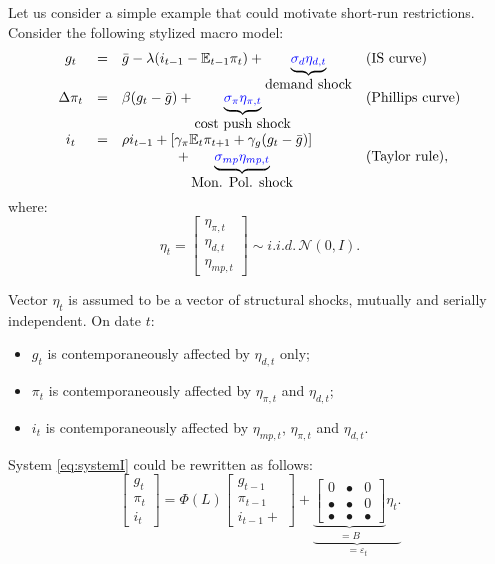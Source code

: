 \documentclass[
  11pt,
]{book}
\providecommand{\tightlist}{%
  \setlength{\itemsep}{0pt}\setlength{\parskip}{0pt}}
\theoremstyle{definition}
\theoremstyle{definition}
\theoremstyle{definition}
\theoremstyle{definition}
\theoremstyle{remark}
\begin{document}
Let us consider a simple example that could motivate short-run restrictions. Consider the following stylized macro model:
\begin{equation}
\begin{array}{clll}
g_{t}&=& \bar{g}-\lambda(i_{t-1}-\mathbb{E}_{t-1}\pi_{t})+ \underbrace{{\color{blue}\sigma_d \eta_{d,t}}}_{\mbox{demand shock}}& (\mbox{IS curve})\\
\Delta \pi_{t} & = & \beta (g_{t} - \bar{g})+ \underbrace{{\color{blue}\sigma_{\pi} \eta_{\pi,t}}}_{\mbox{cost push shock}} & (\mbox{Phillips curve})\\
i_{t} & = & \rho i_{t-1} + \left[ \gamma_\pi \mathbb{E}_{t}\pi_{t+1}  + \gamma_g (g_{t} - \bar{g}) \right]\\
&& \qquad \qquad+\underbrace{{\color{blue}\sigma_{mp} \eta_{mp,t}}}_{\mbox{Mon. Pol. shock}} & (\mbox{Taylor rule}),
\end{array}\label{eq:systemI}
\end{equation}
where:
\begin{equation}
\eta_t = 
\left[
\begin{array}{c}
\eta_{\pi,t}\\
\eta_{d,t}\\
\eta_{mp,t}
\end{array}
\right]
\sim i.i.d.\,\mathcal{N}(0,I).\label{eq:covU}
\end{equation}

Vector \(\eta_t\) is assumed to be a vector of structural shocks, mutually and serially independent. On date \(t\):

\begin{itemize}
\tightlist
\item
  \(g_t\) is contemporaneously affected by \(\eta_{d,t}\) only;
\item
  \(\pi_t\) is contemporaneously affected by \(\eta_{\pi,t}\) and \(\eta_{d,t}\);
\item
  \(i_t\) is contemporaneously affected by \(\eta_{mp,t}\), \(\eta_{\pi,t}\) and \(\eta_{d,t}\).
\end{itemize}

System \eqref{eq:systemI} could be rewritten as follows:
\begin{equation}
\left[\begin{array}{c}
g_t\\
\pi_t\\
i_t
\end{array}\right]
= \Phi(L)
\left[\begin{array}{c}
g_{t-1}\\
\pi_{t-1}\\
i_{t-1} +
\end{array}\right] +\underbrace{\underbrace{
\left[
\begin{array}{ccc}
0 & \bullet & 0 \\
\bullet & \bullet & 0 \\
\bullet & \bullet & \bullet
\end{array}
\right]}_{=B} \eta_t.}_{=\varepsilon_t}\label{eq:BBBB}
\end{equation}
\end{document}
